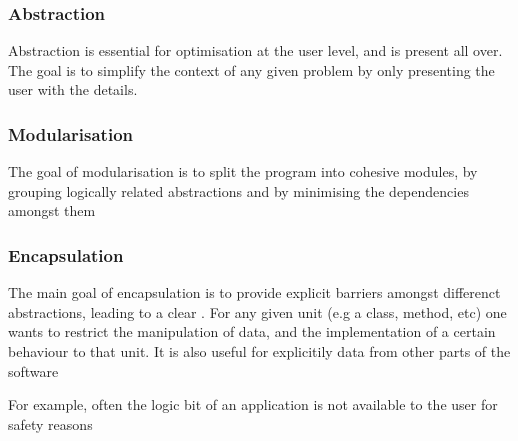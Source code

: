 	\subsubsection{Abstraction}
 		
 		\par{Abstraction is essential for optimisation at the user level, and is present all over. The goal is to simplify the context of any given problem by only presenting the user with the  details.}




	\subsubsection{Modularisation}

		\par{The goal of modularisation is to split the program into cohesive modules, by grouping logically related abstractions and by minimising the dependencies amongst them}



	\subsubsection{Encapsulation}


		\par{The main goal of encapsulation is to provide explicit barriers amongst differenct abstractions, leading to a clear . For any given unit (e.g a class, method, etc) one wants to restrict the manipulation of data, and the implementation of a certain behaviour to that unit. It is also useful for explicitily  data from other parts of the software}
		\par{For example, often the logic bit of an application is not available to the user for safety reasons}


